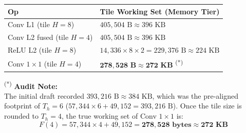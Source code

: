 \documentclass[11pt,a4paper]{article}
\begin{document}
\begin{table}[H]
\centering
\begin{tabular}{ll}
\toprule
\textbf{Op} & \textbf{Tile Working Set (Memory Tier)} \\
\midrule
Conv L1 (tile $H=8$)       & $405,504\text{ B} \approx 396\text{ KB}$ \\
Conv L2 fused (tile $H=4$) & $405,504\text{ B} \approx 396\text{ KB}$ \\
ReLU L2 (tile $H=8$)       & $14,336 \times 8 \times 2 = 229,376\text{ B} \approx 224\text{ KB}$ \\
Conv $1\times 1$ (tile $H=4$) & $\mathbf{278,528\text{ B} \approx 272\text{ KB}}$ \textsuperscript{(*)} \\
\bottomrule
\end{tabular}
\end{table}

\textsuperscript{(*)} \textbf{\textcolor{highlightblue}{Audit Note:}} \\
The initial draft recorded $393,216\text{ B} \approx 384\text{ KB}$, which was the pre-aligned footprint of $T_h = 6$ ($57,344 \times 6 + 49,152 = 393,216\text{ B}$). Once the tile size is rounded to $T_h = 4$, the true working set of Conv $1\times 1$ is:
$$F(4) = 57,344 \times 4 + 49,152 = \mathbf{278,528\text{ bytes}} \approx \mathbf{272\text{ KB}}$$
\end{document}
